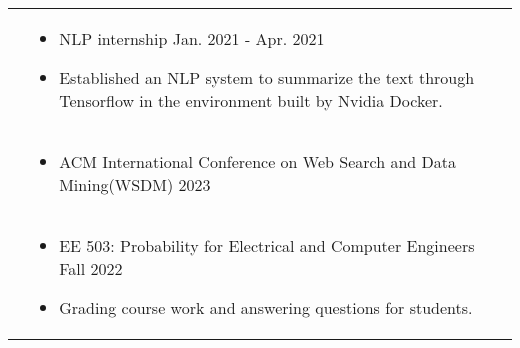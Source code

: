 \documentclass[letterpaper, 10pt]{article}
\begin{document}
\begin{longtable}{p{1.3in}p{4.8in}}
&  \begin{itemize}[leftmargin=10pt, itemsep=-5pt, topsep=0pt,before=\textbf{Transwarp}]
    \item NLP internship \hfill Jan. 2021 - Apr. 2021 
    \item  Established an NLP system to summarize the text through Tensorflow in the environment built by Nvidia Docker.
  \end{itemize}\\ 


{\color{black}{Professional service}}
&  \begin{itemize}[leftmargin=10pt,topsep=0pt,before=\textbf{Program Committee}]
    \item ACM International Conference on Web Search and Data Mining(WSDM) 2023
  \end{itemize}\\ 


{\color{black}{Teaching Experience}} 
&  \begin{itemize}[leftmargin=10pt, itemsep=-5pt, topsep=0pt,before=\textbf{Teaching assistant, University of Southern California}]
    \item EE 503: Probability for Electrical and Computer Engineers \hfill Fall 2022
    \item  Grading course work and answering questions for students.
  \end{itemize}\\ 









\end{longtable}
\end{document}
